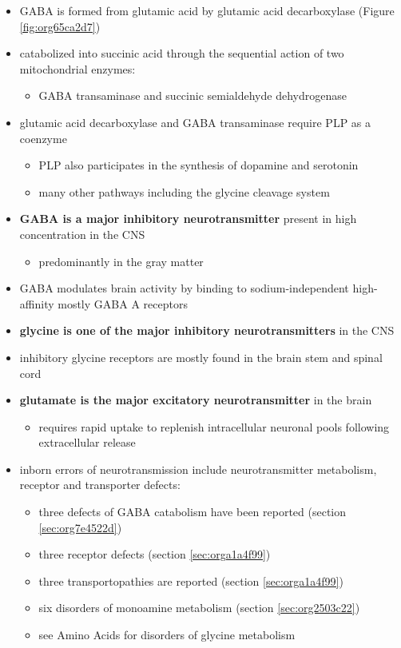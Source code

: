 \documentclass[12pt]{scrartcl}
\begin{document}
\begin{itemize}
\item GABA is formed from glutamic acid by glutamic acid decarboxylase
(Figure \ref{fig:org65ca2d7})
\item catabolized into succinic acid through the sequential action of two
mitochondrial enzymes:
\begin{itemize}
\item GABA transaminase and succinic semialdehyde dehydrogenase
\end{itemize}
\item glutamic acid decarboxylase and GABA transaminase require PLP as a coenzyme
\begin{itemize}
\item PLP also participates in the synthesis of dopamine and serotonin
\item many other pathways including the glycine cleavage system
\end{itemize}
\item \textbf{GABA is a major inhibitory neurotransmitter} present in high
concentration in the CNS
\begin{itemize}
\item predominantly in the gray matter
\end{itemize}
\item GABA modulates brain activity by binding to
sodium-independent high-affinity  mostly GABA A receptors
\item \textbf{glycine is one of the major inhibitory neurotransmitters} in the CNS
\item inhibitory glycine receptors are mostly found in the brain stem
and spinal cord
\item \textbf{glutamate is the major excitatory neurotransmitter} in the brain
\begin{itemize}
\item requires rapid uptake to replenish intracellular
neuronal pools following extracellular release
\end{itemize}
\item inborn errors of neurotransmission include neurotransmitter
metabolism, receptor and transporter defects:
\begin{itemize}
\item three defects of GABA catabolism have been reported (section \ref{sec:org7e4522d})
\item three receptor defects (section \ref{sec:orga1a4f99})
\item three transportopathies are reported (section \ref{sec:orga1a4f99})
\item six disorders of monoamine metabolism (section \ref{sec:org2503c22})
\item see Amino Acids for disorders of glycine metabolism
\end{itemize}
\end{itemize}
\end{document}
